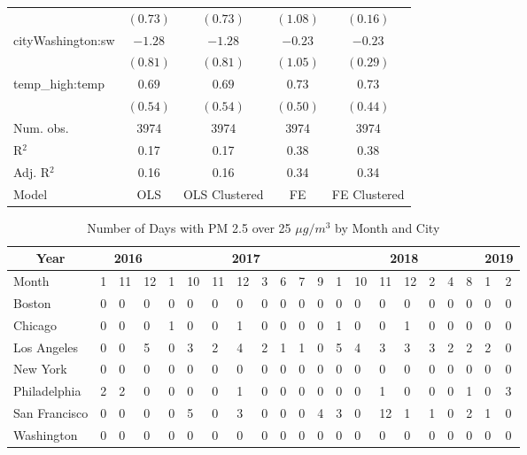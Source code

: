 \documentclass[12pt,letter paper]{article}
\begin{document}
\begin{center}
\begin{longtable}{l c c c c }
                        & $(0.73)$      & $(0.73)$      & $(1.08)$      & $(0.16)$      \\
cityWashington:sw       & $-1.28$       & $-1.28$       & $-0.23$       & $-0.23$       \\
                        & $(0.81)$      & $(0.81)$      & $(1.05)$      & $(0.29)$      \\
temp\_high:temp         & $0.69$        & $0.69$        & $0.73$        & $0.73$        \\
                        & $(0.54)$      & $(0.54)$      & $(0.50)$      & $(0.44)$      \\
\hline
Num. obs.               & 3974          & 3974          & 3974          & 3974          \\
R$^2$      & 0.17          & 0.17          & 0.38          & 0.38          \\
Adj. R$^2$  & 0.16          & 0.16          & 0.34          & 0.34          \\
Model  & OLS & OLS Clustered & FE & FE Clustered \\
\end{longtable}
\end{center}



\begin{table}[H]
\centering
\begin{tabular}{| l | lll | llllllll | lllllll | ll |}

\multicolumn{1}{c}{Year} & \multicolumn{3}{c}{2016}  & \multicolumn{8}{c}{2017} & \multicolumn{7}{c}{2018} &\multicolumn{2}{c}{2019} \\
 \hline
Month & 1 & 11 & 12 & 1 & 10 & 11 & 12 & 3 & 6 & 7 & 9 & 1 & 10 & 11 & 12 & 2 & 4 & 8 & 1 & 2 \\ 
  \hline
Boston &   0 &   0 &   0 &   0 &   0 &   0 &   0 &   0 &   0 &   0 &   0 &   0 &   0 &   0 &   0 &   0 &   0 &   0 &   0 &   0 \\ 
  Chicago &   0 &   0 &   0 &   1 &   0 &   0 &   1 &   0 &   0 &   0 &   0 &   1 &   0 &   0 &   1 &   0 &   0 &   0 &   0 &   0 \\ 
  Los Angeles &   0 &   0 &   5 &   0 &   3 &   2 &   4 &   2 &   1 &   1 &   0 &   5 &   4 &   3 &   3 &   3 &   2 &   2 &   2 &   0 \\ 
  New York &   0 &   0 &   0 &   0 &   0 &   0 &   0 &   0 &   0 &   0 &   0 &   0 &   0 &   0 &   0 &   0 &   0 &   0 &   0 &   0 \\ 
  Philadelphia &   2 &   2 &   0 &   0 &   0 &   0 &   1 &   0 &   0 &   0 &   0 &   0 &   0 &   1 &   0 &   0 &   0 &   1 &   0 &   3 \\ 
  San Francisco &   0 &   0 &   0 &   0 &   5 &   0 &   3 &   0 &   0 &   0 &   4 &   3 &   0 &  12 &   1 &   1 &   0 &   2 &   1 &   0 \\ 
  Washington &   0 &   0 &   0 &   0 &   0 &   0 &   0 &   0 &   0 &   0 &   0 &   0 &   0 &   0 &   0 &   0 &   0 &   0 &   0 &   0 \\ 
   \hline
\end{tabular}
\caption{Number of Days with PM 2.5 over 25 $\mu g/m^3$ by Month and City}
\end{table}
\egroup
\end{document}
